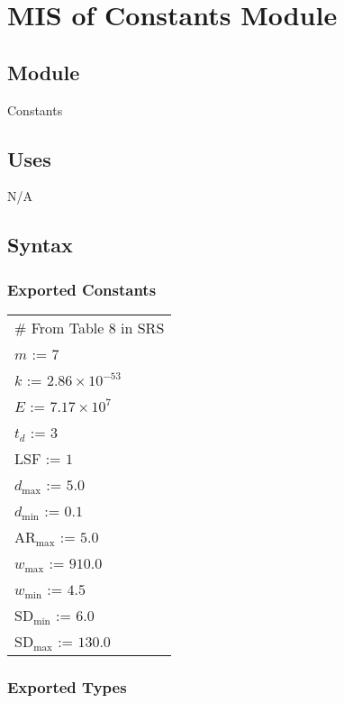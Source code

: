 \documentclass[12pt, titlepage]{article}
\begin{document}
\newpage


\section{MIS of Constants Module} \label{Constants}

\subsection{Module}

Constants

\subsection {Uses}

N/A

\subsection {Syntax}

\subsubsection {Exported Constants}

\renewcommand{\arraystretch}{1.2}
\begin{longtable*}[l]{l} 
\# From Table 8 in SRS\\
$m$ := 7\\
$k$ := $2.86\times 10^{-53}$\\
$E$ := $7.17\times 10^{7}$\\
${t_{d}}$ := $3$\\
LSF := $1$\\
${d_{\text{max}}}$ := $5.0$\\
${d_{\text{min}}}$ := $0.1$\\
${\text{AR}_{\text{max}}}$ := $5.0$\\
${w_{\text{max}}}$ := $910.0$\\
${w_{\text{min}}}$ := $4.5$\\
${\text{SD}_{\text{min}}}$ := $6.0$\\
${\text{SD}_{\text{max}}}$ := $130.0$\\
\end{longtable*}

\subsubsection {Exported Types}
\end{document}

